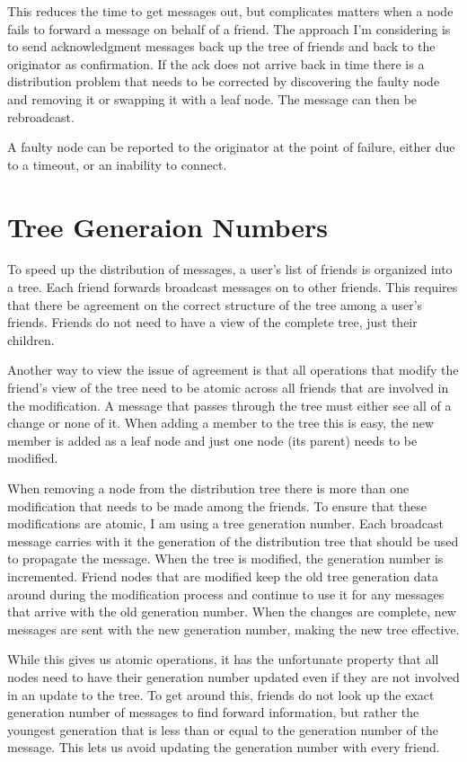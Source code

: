 \documentclass[letterpaper,11pt,oneside]{article}
\begin{document}
This reduces the time to get messages out, but complicates matters when a node
fails to forward a message on behalf of a friend. The approach I'm considering
is to send acknowledgment messages back up the tree of friends and back to the
originator as confirmation. If the ack does not arrive back in time there is a
distribution problem that needs to be corrected by discovering the faulty node
and removing it or swapping it with a leaf node. The message can then be
rebroadcast. 

A faulty node can be reported to the originator at the point of failure, either
due to a timeout, or an inability to connect. 

\section{Tree Generaion Numbers}

To speed up the distribution of messages, a user's list of friends is 
organized into a tree. Each friend forwards broadcast messages on to 
other friends. This requires that there be agreement on the correct 
structure of the tree among a user's friends. Friends do not need to 
have a view of the complete tree, just their children.

Another way to view the issue of agreement is that all operations that 
modify the friend's view of the tree need to be atomic across all 
friends that are involved in the modification. A message that passes 
through the tree must either see all of a change or none of it. When 
adding a member to the tree this is easy, the new member is added as a 
leaf node and just one node (its parent) needs to be modified.

When removing a node from the distribution tree there is more than one 
modification that needs to be made among the friends. To ensure that 
these modifications are atomic, I am using a tree generation number. 
Each broadcast message carries with it the generation of the 
distribution tree that should be used to propagate the message. When the 
tree is modified, the generation number is incremented. Friend nodes 
that are modified keep the old tree generation data around during the 
modification process and continue to use it for any messages that arrive 
with the old generation number. When the changes are complete, new 
messages are sent with the new generation number, making the new tree 
effective.

While this gives us atomic operations, it has the unfortunate property 
that all nodes need to have their generation number updated even if they 
are not involved in an update to the tree. To get around this, friends 
do not look up the exact generation number of messages to find forward 
information, but rather the youngest generation that is less than or 
equal to the generation number of the message. This lets us avoid 
updating the generation number with every friend.
\end{document}
